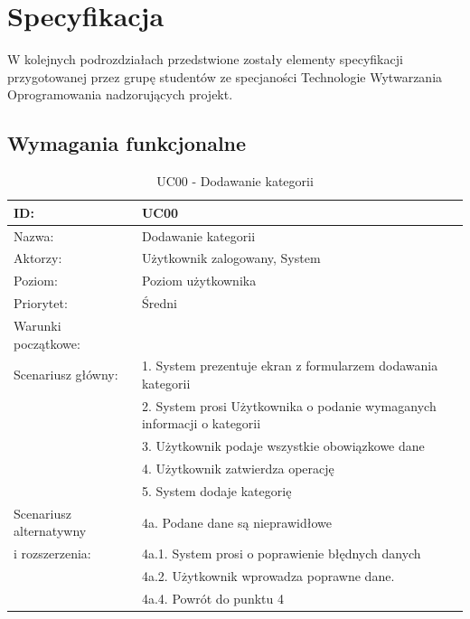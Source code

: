 \chapter{Specyfikacja}

W kolejnych podrozdziałach przedstwione zostały elementy specyfikacji przygotowanej przez grupę studentów ze specjaności Technologie Wytwarzania Oprogramowania nadzorujących projekt.

\section{Wymagania funkcjonalne}

\begin{table}[H]
    \begin{tabular}{|p{5cm}|p{9cm}|}\hline
	ID: & UC00 \\\hline
    Nazwa: & Dodawanie kategorii \\\hline
    Aktorzy: & Użytkownik zalogowany, System \\\hline
    Poziom: & Poziom użytkownika  \\\hline
    Priorytet: & Średni \\\hline
    Warunki początkowe: & ~ \\\hline
    Scenariusz główny: & 1. System prezentuje ekran z formularzem dodawania kategorii \\
    ~ & 2. System prosi Użytkownika o podanie wymaganych informacji o kategorii \\
    ~ & 3. Użytkownik podaje wszystkie obowiązkowe dane \\
    ~ & 4. Użytkownik zatwierdza operację \\
    ~ & 5. System dodaje kategorię \\\hline
    Scenariusz alternatywny & 4a. Podane dane są nieprawidłowe \\
    i rozszerzenia: & 4a.1. System prosi o poprawienie błędnych danych \\
    ~ & 4a.2. Użytkownik wprowadza poprawne dane. \\
    ~ & 4a.4. Powrót do punktu 4 \\
    \hline\end{tabular}
	\caption{UC00 - Dodawanie kategorii}
\end{table}

